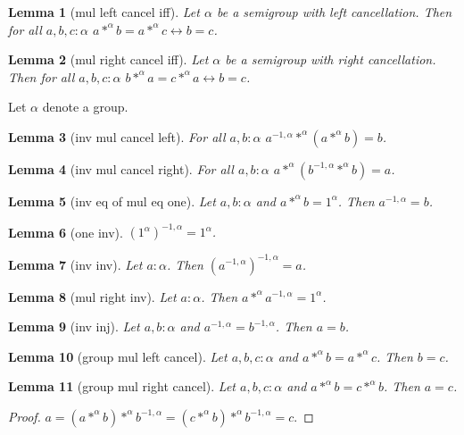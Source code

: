 \documentclass[12pt]{article}
\newtheorem{lemma}{Lemma}
\begin{document}
\begin{lemma}[mul left cancel iff] Let $\alpha$ be a 
semigroup with left cancellation. Then for all $a,b,c : \alpha$
$a *^{\alpha} b = a *^{\alpha} c \leftrightarrow b = c$.
\end{lemma}

\begin{lemma}[mul right cancel iff] Let $\alpha$ be a 
semigroup with right cancellation. Then for all $a,b,c : \alpha$
$b *^{\alpha} a = c *^{\alpha} a \leftrightarrow b = c$.
\end{lemma}

Let $\alpha$ denote a group.

\begin{lemma}[inv mul cancel left] For all $a,b : \alpha$
$a^{-1,\alpha} *^{\alpha} (a *^{\alpha} b) = b$.
\end{lemma}

\begin{lemma}[inv mul cancel right] For all $a,b : \alpha$
$a *^{\alpha} (b^{-1,\alpha} *^{\alpha} b) = a$.
\end{lemma}

\begin{lemma}[inv eq of mul eq one] Let $a, b : \alpha$ and
$a *^{\alpha} b = 1^{\alpha}$. Then $a^{-1,\alpha} = b$.
\end{lemma}

\begin{lemma}[one inv] $(1^{\alpha})^{-1,\alpha} = 1^{\alpha}$.
\end{lemma}

\begin{lemma}[inv inv] Let $a : \alpha$. Then
$(a^{-1,\alpha})^{-1,\alpha} = a$.
\end{lemma}

\begin{lemma}[mul right inv] Let $a : \alpha$. Then 
$a *^{\alpha} a^{-1,\alpha} = 1^{\alpha}$.
\end{lemma}

\begin{lemma}[inv inj] Let $a,b : \alpha$ and $a^{-1,\alpha} = b^{-1,\alpha}$.
Then $a = b$.\end{lemma}

\begin{lemma}[group mul left cancel] Let $a,b,c : \alpha$ and
$a *^{\alpha} b = a *^{\alpha} c$. Then $b = c$.
\end{lemma}

\begin{lemma}[group mul right cancel] Let $a,b,c : \alpha$ and
$a *^{\alpha} b = c *^{\alpha} b$. Then $a = c$.
\end{lemma}
\begin{proof} $a = (a *^{\alpha} b) *^{\alpha} b^{-1,\alpha}
= (c *^{\alpha} b) *^{\alpha} b^{-1,\alpha} = c$.
\end{proof}
\end{document}
